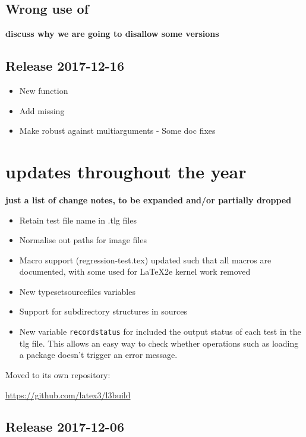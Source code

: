 \documentclass{ltnews}
\begin{document}
\subsection{Wrong use of }

\textbf{discuss why we are going to disallow some versions}



\subsection{Release 2017-12-16}

\begin{itemize}
\item New  function
\item Add missing 
\item Make  robust against multi\itemtoken arguments
- Some doc fixes 
\end{itemize}



\section{ updates throughout the year}

\textbf{just a list of change notes, to be expanded and/or partially dropped}

\begin{itemize}
\item Retain test file name in .tlg files
\item Normalise out paths for image files
\item Macro support (regression-test.tex) updated such that
  all macros are documented, with some used for LaTeX2e kernel
  work removed
\item New typesetsourcefiles variables
\item Support for subdirectory structures in sources
\item New variable \texttt{recordstatus} for included the output status of each test in the tlg file. This allows an easy way to check whether operations such as loading a package doesn't trigger an error message.
\end{itemize}

Moved  to its own repository:

\url{https://github.com/latex3/l3build}


\subsection{Release 2017-12-06}
\end{document}
